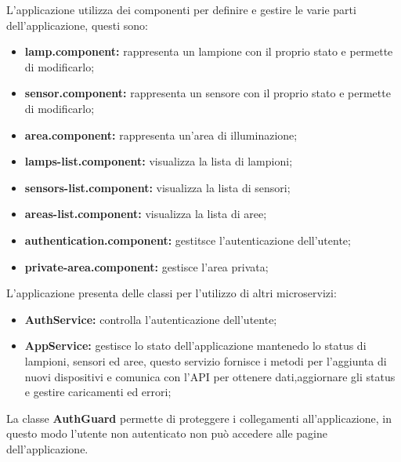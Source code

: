 L'applicazione utilizza dei componenti per definire e gestire le varie parti dell'applicazione, questi sono:
\begin{itemize}
    \item \textbf{lamp.component:} rappresenta un lampione con il proprio stato e permette di modificarlo;
    \item \textbf{sensor.component:} rappresenta un sensore con il proprio stato e permette di modificarlo;
    \item \textbf{area.component:} rappresenta un'area di illuminazione;
    \item \textbf{lamps-list.component:} visualizza la lista di lampioni;
    \item \textbf{sensors-list.component:} visualizza la lista di sensori;
    \item \textbf{areas-list.component:} visualizza la lista di aree;
    \item \textbf{authentication.component:} gestitsce l'autenticazione dell'utente;
    \item \textbf{private-area.component:} gestisce l'area privata;
\end{itemize}

L'applicazione presenta delle classi per l'utilizzo di altri microservizi:
\begin{itemize}
    \item \textbf{AuthService:} controlla l'autenticazione dell'utente;
    \item \textbf{AppService:} gestisce lo stato dell'applicazione mantenedo lo status di lampioni, sensori ed aree, questo servizio fornisce i metodi per l'aggiunta di nuovi dispositivi e comunica con l'API per ottenere dati,aggiornare gli status e gestire caricamenti ed errori;
\end{itemize}

La classe \textbf{AuthGuard} permette di proteggere i collegamenti all'applicazione, in questo modo l'utente non autenticato non può accedere alle pagine dell'applicazione.